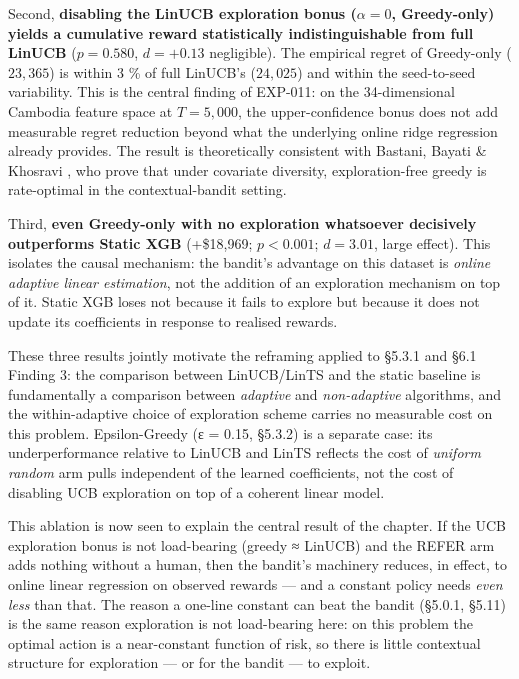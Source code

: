 Second, \textbf{disabling the LinUCB exploration bonus (\(\alpha = 0\), Greedy-only) yields a cumulative reward statistically indistinguishable from full LinUCB} (\(p = 0.580\), \(d = +0.13\) negligible). The empirical regret of Greedy-only (\(23{,}365\)) is within 3 \% of full LinUCB's (\(24{,}025\)) and within the seed-to-seed variability. This is the central finding of EXP-011: on the 34-dimensional Cambodia feature space at \(T = 5{,}000\), the upper-confidence bonus does not add measurable regret reduction beyond what the underlying online ridge regression already provides. The result is theoretically consistent with Bastani, Bayati \& Khosravi \citeyearpar{Bastani2021}, who prove that under covariate diversity, exploration-free greedy is rate-optimal in the contextual-bandit setting.

Third, \textbf{even Greedy-only with no exploration whatsoever decisively outperforms Static XGB} (+\$18,969; \(p < 0.001\); \(d = 3.01\), large effect). This isolates the causal mechanism: the bandit's advantage on this dataset is \emph{online adaptive linear estimation}, not the addition of an exploration mechanism on top of it. Static XGB loses not because it fails to explore but because it does not update its coefficients in response to realised rewards.

These three results jointly motivate the reframing applied to §5.3.1 and §6.1 Finding 3: the comparison between LinUCB/LinTS and the static baseline is fundamentally a comparison between \emph{adaptive} and \emph{non-adaptive} algorithms, and the within-adaptive choice of exploration scheme carries no measurable cost on this problem. Epsilon-Greedy (ε = 0.15, §5.3.2) is a separate case: its underperformance relative to LinUCB and LinTS reflects the cost of \emph{uniform random} arm pulls independent of the learned coefficients, not the cost of disabling UCB exploration on top of a coherent linear model.

This ablation is now seen to explain the central result of the chapter. If the UCB exploration bonus is not load-bearing (greedy ≈ LinUCB) and the REFER arm adds nothing without a human, then the bandit's machinery reduces, in effect, to online linear regression on observed rewards --- and a constant policy needs \emph{even less} than that. The reason a one-line constant can beat the bandit (§5.0.1, §5.11) is the same reason exploration is not load-bearing here: on this problem the optimal action is a near-constant function of risk, so there is little contextual structure for exploration --- or for the bandit --- to exploit.

